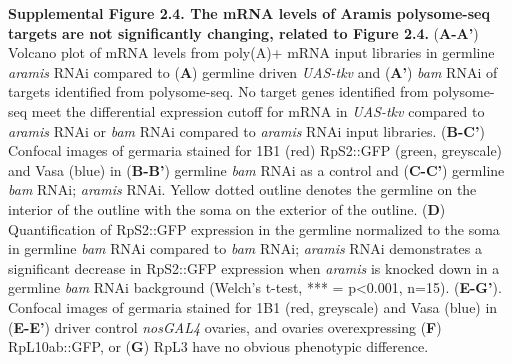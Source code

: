 \documentclass[12pt,twoside]{reedthesis}
\begin{document}
\textbf{Supplemental Figure 2.4. The mRNA levels of Aramis polysome-seq targets
are not significantly changing, related to Figure 2.4.} (\textbf{A-A'})
Volcano plot of mRNA levels from poly(A)+ mRNA input libraries in
germline \emph{aramis} RNAi compared to (\textbf{A}) germline driven \emph{UAS-tkv}
and (\textbf{A'}) \emph{bam} RNAi of targets identified from polysome-seq. No
target genes identified from polysome-seq meet the differential
expression cutoff for mRNA in \emph{UAS-tkv} compared to \emph{aramis} RNAi or
\emph{bam} RNAi compared to \emph{aramis} RNAi input libraries. (\textbf{B-C'})
Confocal images of germaria stained for 1B1 (red) RpS2::GFP (green,
greyscale) and Vasa (blue) in (\textbf{B-B'}) germline \emph{bam} RNAi as a
control and (\textbf{C-C'}) germline \emph{bam} RNAi; \emph{aramis} RNAi. Yellow dotted
outline denotes the germline on the interior of the outline with the
soma on the exterior of the outline. (\textbf{D}) Quantification of RpS2::GFP
expression in the germline normalized to the soma in germline \emph{bam} RNAi
compared to \emph{bam} RNAi; \emph{aramis} RNAi demonstrates a significant
decrease in RpS2::GFP expression when \emph{aramis} is knocked down in a
germline \emph{bam} RNAi background (Welch's t-test, *** = p\textless0.001,
n=15). (\textbf{E-G'}). Confocal images of germaria stained for 1B1 (red,
greyscale) and Vasa (blue) in (\textbf{E-E'}) driver control \emph{nosGAL4}
ovaries, and ovaries overexpressing (\textbf{F}) RpL10ab::GFP, or (\textbf{G})
RpL3 have no obvious phenotypic difference.
\end{document}

